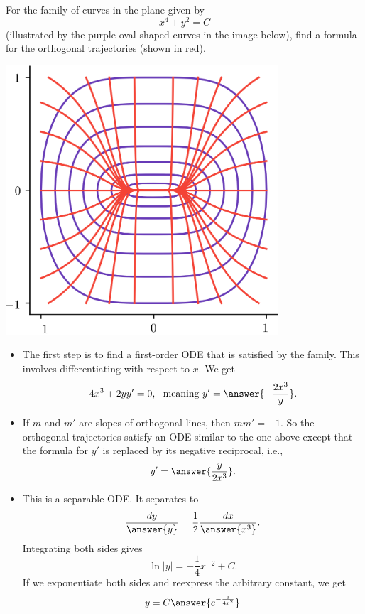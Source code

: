 \documentclass{ximera}
\begin{document}
\begin{example}
For the family of curves in the plane given by 
\[ x^4 + y^2 = C \]
(illustrated by the purple oval-shaped curves in the image below), 
find a formula for the orthogonal trajectories (shown in red).
\begin{center}
\begin{image}
\includegraphics[width=4in]{images/orthoX01.png}
\end{image}
\end{center}
\begin{itemize}
\item The first step is to find a first-order ODE that is satisfied by the family. This involves differentiating with respect to $x$. We get
\[ 4 x^3 + 2y y' = 0, \ \text{ meaning } y' = \answer{-\frac{2x^3}{y}}. \]
\item If $m$ and $m'$ are slopes of orthogonal lines, then $m m' = -1$. So the orthogonal trajectories satisfy an ODE similar to the one above except that the formula for $y'$ is replaced by its negative reciprocal, i.e.,
\[ y' = \answer{\frac{y}{2x^3}}. \]
\item This is a separable ODE. It separates to
\[ \frac{dy}{\answer{y}} = \frac{1}{2} \frac{dx}{\answer{x^3}}. \]
Integrating both sides gives
\[ \ln |y| = - \frac{1}{4} x^{-2} + C. \]
If we exponentiate both sides and reexpress the arbitrary constant, we get
\[ y = C \answer{e^{-\frac{1}{4x^2}}} \]
\end{itemize}
\end{example}
\end{document}

